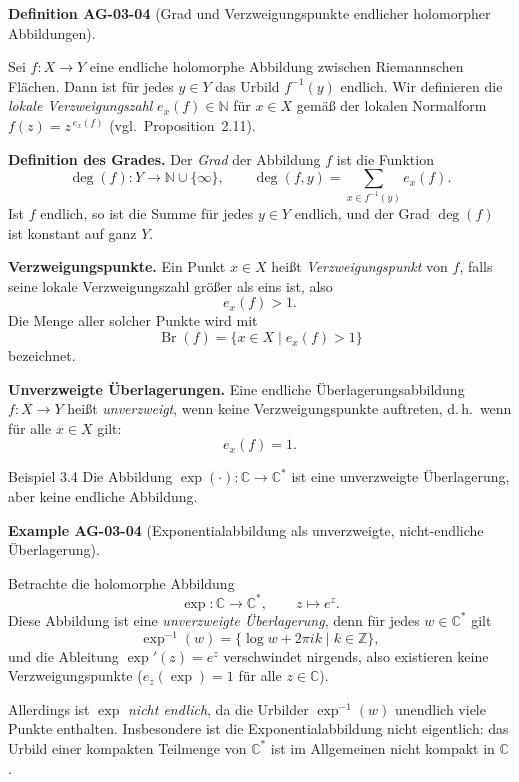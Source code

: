 \documentclass[10pt, letterpaper]{article}
\newcommand{\Z}{\mathbb{Z}}
\newcommand{\C}{\mathbb{C}}
\newcommand{\CustomHeading}[3]{%
  \par\medskip\noindent%
  \textbf{#1 #2} \textnormal{(#3)}.\enskip%
}
\newenvironment{DEF}[2]{\begin{unitbox}\CustomHeading{Definition}{#1}{#2}}{\end{unitbox}}
\newenvironment{EXA}[2]{\begin{unitbox}\CustomHeading{Example}{#1}{#2}}{\end{unitbox}}
\begin{document}
\begin{DEF}{AG-03-04}{Grad und Verzweigungspunkte endlicher holomorpher Abbildungen}
Sei \(f:X\to Y\) eine endliche holomorphe Abbildung zwischen Riemannschen Flächen.
Dann ist für jedes \(y\in Y\) das Urbild \(f^{-1}(y)\) endlich.
Wir definieren die \emph{lokale Verzweigungszahl} \(e_x(f)\in\mathbb{N}\)
für \(x\in X\) gemäß der lokalen Normalform \(f(z)=z^{\,e_x(f)}\) (vgl.\ Proposition~2.11).

\medskip
\noindent
\textbf{Definition des Grades.}
Der \emph{Grad} der Abbildung \(f\) ist die Funktion
\[
\deg(f):Y\longrightarrow \mathbb{N}\cup\{\infty\},\qquad
\deg(f,y)=\sum_{x\in f^{-1}(y)} e_x(f).
\]
Ist \(f\) endlich, so ist die Summe für jedes \(y\in Y\) endlich,
und der Grad \(\deg(f)\) ist konstant auf ganz \(Y\).

\medskip
\noindent
\textbf{Verzweigungspunkte.}
Ein Punkt \(x\in X\) heißt \emph{Verzweigungspunkt} von \(f\),
falls seine lokale Verzweigungszahl größer als eins ist, also
\[
e_x(f)>1.
\]
Die Menge aller solcher Punkte wird mit
\[
\operatorname{Br}(f)=\{x\in X\mid e_x(f)>1\}
\]
bezeichnet.

\medskip
\noindent
\textbf{Unverzweigte Überlagerungen.}
Eine endliche Überlagerungsabbildung \(f:X\to Y\) heißt
\emph{unverzweigt}, wenn keine Verzweigungspunkte auftreten, d.\,h.\
wenn für alle \(x\in X\) gilt:
\[
e_x(f)=1.
\]
\end{DEF}


Beispiel 3.4 Die Abbildung $\exp (\cdot): \mathbb{C} \longrightarrow \mathbb{C}^{*}$ ist eine unverzweigte Überlagerung, aber keine endliche Abbildung.

\begin{EXA}{AG-03-04}{Exponentialabbildung als unverzweigte, nicht-endliche Überlagerung}
Betrachte die holomorphe Abbildung
\[
\exp:\C\longrightarrow\C^*,\qquad z\longmapsto e^{z}.
\]
Diese Abbildung ist eine \emph{unverzweigte Überlagerung}, denn für jedes
\(w\in\C^*\) gilt
\[
\exp^{-1}(w)=\{\log w+2\pi i k \mid k\in\Z\},
\]
und die Ableitung \(\exp'(z)=e^z\) verschwindet nirgends,
also existieren keine Verzweigungspunkte (\(e_z(\exp)=1\) für alle \(z\in\C\)).

Allerdings ist \(\exp\) \emph{nicht endlich}, da die Urbilder
\(\exp^{-1}(w)\) unendlich viele Punkte enthalten.
Insbesondere ist die Exponentialabbildung nicht eigentlich:
das Urbild einer kompakten Teilmenge von \(\C^*\)
ist im Allgemeinen nicht kompakt in \(\C\).
\end{EXA}
\end{document}
